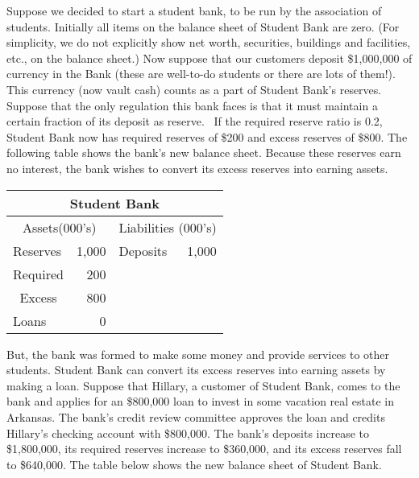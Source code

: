 \documentclass[letterpaper,12pt]{article}
\begin{document}
Suppose we decided to start a student bank, to be run by the
association of students. Initially all items on the balance sheet of
Student Bank are zero. (For simplicity, we do not explicitly show
net worth, securities, buildings and facilities, etc., on the
balance sheet.) Now suppose that our customers deposit \$1,000,000
of currency in the Bank (these are well-to-do students or there are
lots of them!). This currency (now vault cash) counts as a part of
Student Bank's reserves. Suppose that the only regulation this bank
faces is that it must maintain a certain fraction of its deposit as
reserve. \ If the required reserve ratio is 0.2, Student Bank now
has required reserves of \$200 and excess reserves of \$800. The
following table shows the bank's new balance sheet. Because these
reserves earn no interest, the bank wishes to convert its excess
reserves into earning assets.

\begin{center}
\begin{tabular}{|l|r|l|r|}
\hline
\multicolumn{4}{|c|}{Student Bank} \\
\hline \multicolumn{2}{|c|}{Assets(000's)} &
\multicolumn{2}{l|}{Liabilities (000's)}
\\ \hline\hline
\multicolumn{1}{|l|}{Reserves} & \multicolumn{1}{|r|}{1,000} &
\multicolumn{1}{|l|}{Deposits} & 1,000 \\
\multicolumn{1}{|c|}{Required} & 200 & \multicolumn{1}{|c}{} &
\multicolumn{1}{|c|}{} \\
\multicolumn{1}{|c|}{Excess} & 800 & \multicolumn{1}{|c}{} &
\multicolumn{1}{|c|}{} \\
\multicolumn{1}{|l|}{Loans} & 0 & \multicolumn{1}{|c|}{} &
\multicolumn{1}{|c|}{} \\ \hline
\end{tabular}
\end{center}

But, the bank was formed to make some money and provide services to
other students. Student Bank can convert its excess reserves into
earning assets by making a loan. Suppose that Hillary, a customer of
Student Bank, comes to the bank and applies for an \$800,000 loan to
invest in some vacation real estate in Arkansas. The bank's credit
review committee approves the loan and credits Hillary's checking
account with \$800,000. The bank's deposits increase to \$1,800,000,
its required reserves increase to \$360,000, and its excess reserves
fall to \$640,000. The table below shows the new balance sheet of
Student Bank.
\end{document}
